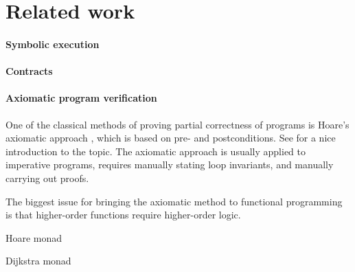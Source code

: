 


\section{Related work}
\label{sec:relatedwork}

\paragraph{Symbolic execution}

\paragraph{Contracts}

\paragraph{Axiomatic program verification}

One of the classical methods of proving partial correctness of programs is Hoare's axiomatic approach \cite{Hoare1969}, which is based on pre- and postconditions.
See \citet{NielsonN1992} for a nice introduction to the topic.
The axiomatic approach is usually applied to imperative programs, requires manually stating loop invariants, and manually carrying out proofs.

The biggest issue for bringing the axiomatic method to functional programming is that higher-order functions require higher-order logic.

\begin{compactitem}
\item Hoare monad
\item Dijkstra monad
\end{compactitem}
